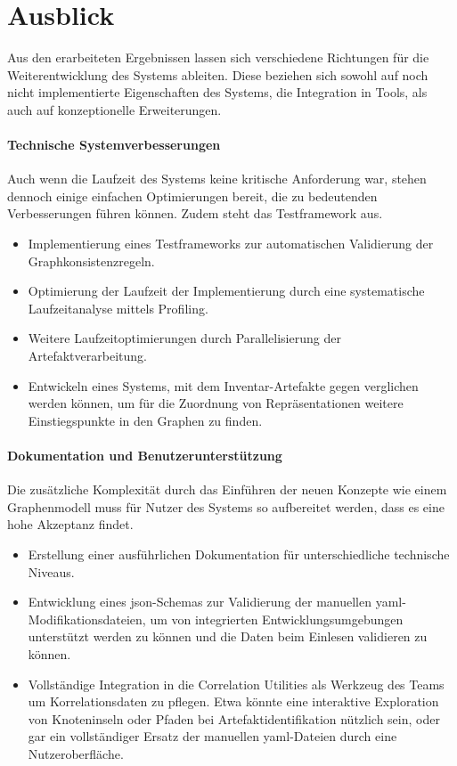 \section{Ausblick}\label{sec:schluss-ausblick}

Aus den erarbeiteten Ergebnissen lassen sich verschiedene Richtungen für die Weiterentwicklung des Systems ableiten.
Diese beziehen sich sowohl auf noch nicht implementierte Eigenschaften des Systems, die Integration in Tools, als auch auf konzeptionelle Erweiterungen.

\paragraph{Technische Systemverbesserungen}

Auch wenn die Laufzeit des Systems keine kritische Anforderung war, stehen dennoch einige einfachen Optimierungen bereit, die zu bedeutenden Verbesserungen führen können.
Zudem steht das Testframework aus.

\begin{itemize}
    \itemsep0em
    \item Implementierung eines Testframeworks zur automatischen Validierung der Graphkonsistenzregeln.
    \item Optimierung der Laufzeit der Implementierung durch eine systematische Laufzeitanalyse mittels Profiling.
    \item Weitere Laufzeitoptimierungen durch Parallelisierung der Artefaktverarbeitung.
    \item Entwickeln eines Systems, mit dem Inventar-Artefakte gegen  verglichen werden können, um für die Zuordnung von Repräsentationen weitere Einstiegspunkte in den Graphen zu finden.
\end{itemize}

\paragraph{Dokumentation und Benutzerunterstützung}

Die zusätzliche Komplexität durch das Einführen der neuen Konzepte wie einem Graphenmodell muss für Nutzer des Systems so aufbereitet werden, dass es eine hohe Akzeptanz findet.

\begin{itemize}
    \itemsep0em
    \item Erstellung einer ausführlichen Dokumentation für unterschiedliche technische Niveaus.
    \item Entwicklung eines \acrshort{json}-Schemas zur Validierung der manuellen \acrshort{yaml}-Modifikationsdateien, um von integrierten Entwicklungsumgebungen unterstützt werden zu können und die Daten beim Einlesen validieren zu können.
    \item Vollständige Integration in die Correlation Utilities als Werkzeug des Teams um Korrelationsdaten zu pflegen.
    Etwa könnte eine interaktive Exploration von Knoteninseln oder Pfaden bei Artefaktidentifikation nützlich sein, oder gar ein vollständiger Ersatz der manuellen \acrshort{yaml}-Dateien durch eine Nutzeroberfläche.
\end{itemize}

